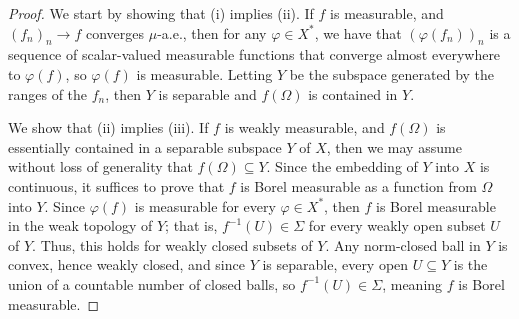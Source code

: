 \documentclass[10pt]{mypackage}
\begin{document}
\begin{proof}
  We start by showing that (i) implies (ii). If $f$ is measurable, and $\left( f_n \right)_n\rightarrow f$ converges $\mu$-a.e., then for any $\varphi\in X^{\ast}$, we have that $\left( \varphi\left( f_n \right) \right)_n$ is a sequence of scalar-valued measurable functions that converge almost everywhere to $\varphi(f)$, so $\varphi(f)$ is measurable. Letting $Y$ be the subspace generated by the ranges of the $f_n$, then $Y$ is separable and $f(\Omega)$ is contained in $Y$.

  We show that (ii) implies (iii). If $f$ is weakly measurable, and $f(\Omega)$ is essentially contained in a separable subspace $Y$ of $X$, then we may assume without loss of generality that $f(\Omega)\subseteq Y$. Since the embedding of $Y$ into $X$ is continuous, it suffices to prove that $f$ is Borel measurable as a function from $\Omega$ into $Y$. Since $\varphi(f)$ is measurable for every $\varphi\in X^{\ast}$, then $f$ is Borel measurable in the weak topology of $Y$; that is, $f^{-1}(U)\in \Sigma$ for every weakly open subset $U$ of $Y$. Thus, this holds for weakly closed subsets of $Y$. Any norm-closed ball in $Y$ is convex, hence weakly closed, and since $Y$ is separable, every open $U\subseteq Y$ is the union of a countable number of closed balls, so $f^{-1}(U)\in \Sigma$, meaning $f$ is Borel measurable.


\end{proof}
\end{document}
